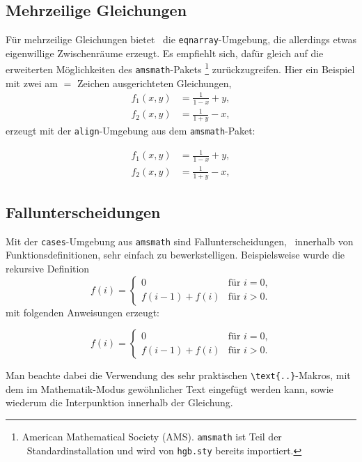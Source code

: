\subsection{Mehrzeilige Gleichungen}

Für mehrzeilige Gleichungen bietet \latex\ die \verb!eqnarray!-Umgebung, die
allerdings etwas eigenwillige Zwischenräume erzeugt. Es empfiehlt sich, dafür
gleich auf die erweiterten Möglichkeiten des \texttt{amsmath}-Pakets%
\footnote{American Mathematical Society (AMS). \texttt{amsmath} ist Teil der
\latex\ Standardinstallation und wird von \texttt{hgb.sty} bereits importiert.}
\cite{Mittelbach2023} zurückzugreifen. Hier ein Beispiel mit zwei am $=$
Zeichen ausgerichteten Gleichungen,
%
\begin{align}
	f_1 (x,y) &= \frac{1}{1-x} + y , \label{eq:f1} \\
	f_2 (x,y) &= \frac{1}{1+y} - x , \label{eq:f2}
\end{align}
%
erzeugt mit der \texttt{align}-Umgebung aus dem \texttt{amsmath}-Paket:
%
\begin{LaTeXCode}[numbers=none]
\begin{align}
  f_1 (x,y) &= \frac{1}{1-x} + y , \label{eq:f1} \\
  f_2 (x,y) &= \frac{1}{1+y} - x , \label{eq:f2}
\end{align}
\end{LaTeXCode}


\subsection{Fallunterscheidungen}

Mit der \texttt{cases}-Umgebung aus \texttt{amsmath} sind Fallunterscheidungen,
\ua\ innerhalb von Funktionsdefinitionen, sehr einfach zu bewerkstelligen.
Beispielsweise wurde die rekursive Definition
%
\begin{equation}
	f(i) =
	\begin{cases}
		0             & \text{für $i = 0$,}\\
		f(i-1) + f(i) & \text{für $i > 0$.}
	\end{cases}
\end{equation}%
%
mit folgenden Anweisungen erzeugt:
%
\begin{LaTeXCode}[numbers=none]
\begin{equation}
	f(i) =
	\begin{cases}
	  0             & \text{für $i = 0$,}\\
	  f(i-1) + f(i) & \text{für $i > 0$.}
	\end{cases}
\end{equation}
\end{LaTeXCode}
%
Man beachte dabei die Verwendung des sehr praktischen \verb!\text{..}!-Makros,
mit dem im Mathematik-Modus gewöhnlicher Text eingefügt werden kann, sowie
wiederum die Interpunktion innerhalb der Gleichung.


